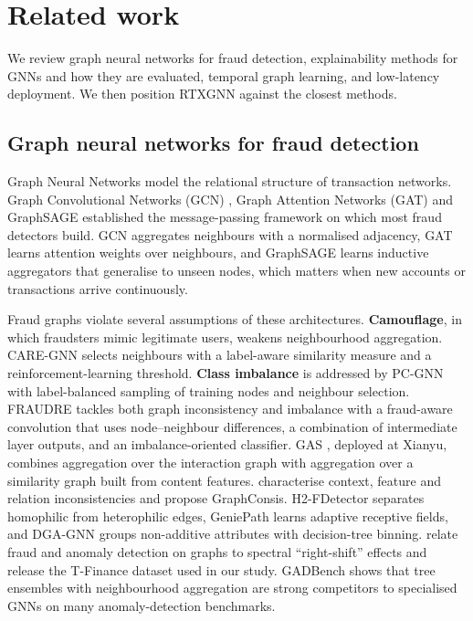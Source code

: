 \section{Related work} \label{sec:related}

We review graph neural networks for fraud detection, explainability methods for GNNs and how they are evaluated, temporal graph learning, and low-latency deployment. We then position RTXGNN against the closest methods.

\subsection{Graph neural networks for fraud detection}

Graph Neural Networks model the relational structure of transaction networks. Graph Convolutional Networks (GCN) \citep{kipf2017gcn, asiri2025graph}, Graph Attention Networks (GAT) \citep{velickovic2018gat,fu2026phishing} and GraphSAGE \citep{hamilton2017graphsage,tang2025application} established the message-passing framework on which most fraud detectors build. GCN aggregates neighbours with a normalised adjacency, GAT learns attention weights over neighbours, and GraphSAGE learns inductive aggregators that generalise to unseen nodes, which matters when new accounts or transactions arrive continuously.

Fraud graphs violate several assumptions of these architectures. \textbf{Camouflage}, in which fraudsters mimic legitimate users, weakens neighbourhood aggregation. CARE-GNN \citep{dou2020caregnn} selects neighbours with a label-aware similarity measure and a reinforcement-learning threshold. \textbf{Class imbalance} is addressed by PC-GNN \citep{liu2021pcgnn} with label-balanced sampling of training nodes and neighbour selection. FRAUDRE \citep{zhang2021fraudre} tackles both graph inconsistency and imbalance with a fraud-aware convolution that uses node--neighbour differences, a combination of intermediate layer outputs, and an imbalance-oriented classifier. GAS \citep{li2019gas}, deployed at Xianyu, combines aggregation over the interaction graph with aggregation over a similarity graph built from content features. \citet{liu2020graphconsis} characterise context, feature and relation inconsistencies and propose GraphConsis. H2-FDetector \citep{shi2022h2fdetector} separates homophilic from heterophilic edges, GeniePath \citep{liu2019geniepath} learns adaptive receptive fields, and DGA-GNN \citep{duan2024dgagnn} groups non-additive attributes with decision-tree binning. \citet{tang2022rethinking} relate fraud and anomaly detection on graphs to spectral ``right-shift'' effects and release the T-Finance dataset used in our study. GADBench \citep{tang2023gadbench} shows that tree ensembles with neighbourhood aggregation are strong competitors to specialised GNNs on many anomaly-detection benchmarks.

